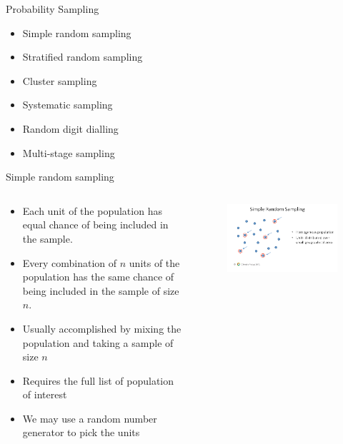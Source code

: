\documentclass[10pt, compress]{beamer}
\begin{document}
\begin{frame}[t]{Probability Sampling}
    \begin{itemize}
        \item Simple random sampling
        \item Stratified random sampling
        \item Cluster sampling
        \item Systematic sampling
        \item Random digit dialling
        \item Multi-stage sampling
    \end{itemize}
\end{frame}

\begin{frame}[t]{Simple random sampling}
    \begin{columns}
        \begin{block}{}
            \small
            \begin{itemize}
                \item Each unit of the population has equal chance of being included in the sample.
                \item Every combination of $n$ units of the population has the same chance of being included in the sample of size $n$.
                \item Usually accomplished by mixing the population and taking a sample of size $n$
                \item Requires the full list of population of interest
                \item We may use a random number generator to pick the units
            \end{itemize}
        \end{block}
        \begin{block}{}
            \begin{figure}
                \begin{center}
                    \includegraphics[scale=0.25]{img/Slide2.png}
                \end{center}
            \end{figure}
        \end{block}
    \end{columns}
\end{frame}
\end{document}
